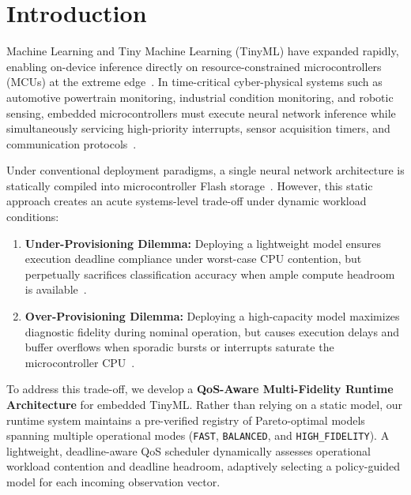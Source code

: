 \documentclass[journal]{IEEEtran}
\begin{document}
\maketitle
\IEEEdisplaynontitleabstractindextext

\section{Introduction}
 Machine Learning and Tiny Machine Learning (TinyML) have expanded rapidly, enabling on-device inference directly on resource-constrained microcontrollers (MCUs) at the extreme edge~\cite{warden2019tinyml,ray2022review,saha2022tinyml}. In time-critical cyber-physical systems such as automotive powertrain monitoring, industrial condition monitoring, and robotic sensing, embedded microcontrollers must execute neural network inference while simultaneously servicing high-priority interrupts, sensor acquisition timers, and communication protocols~\cite{sanchez2020tinyml,banbury2021benchmarking}.

Under conventional deployment paradigms, a single neural network architecture is statically compiled into microcontroller Flash storage~\cite{david2021tensorflow,lin2020mcunet,lin2021mcunetv2}. However, this static approach creates an acute systems-level trade-off under dynamic workload conditions:
\begin{enumerate}
    \item \textbf{Under-Provisioning Dilemma:} Deploying a lightweight model ensures execution deadline compliance under worst-case CPU contention, but perpetually sacrifices classification accuracy when ample compute headroom is available~\cite{sze2017efficient,liberis2021munas}.
    \item \textbf{Over-Provisioning Dilemma:} Deploying a high-capacity model maximizes diagnostic fidelity during nominal operation, but causes execution delays and buffer overflows when sporadic bursts or interrupts saturate the microcontroller CPU~\cite{buttazzo2011hard,lu2002feedback}.
\end{enumerate}

To address this trade-off, we develop a \textbf{QoS-Aware Multi-Fidelity Runtime Architecture} for embedded TinyML. Rather than relying on a static model, our runtime system maintains a pre-verified registry of Pareto-optimal models spanning multiple operational modes (\texttt{FAST}, \texttt{BALANCED}, and \texttt{HIGH\_FIDELITY}). A lightweight, deadline-aware QoS scheduler dynamically assesses operational workload contention and deadline headroom, adaptively selecting a policy-guided model for each incoming observation vector.
\end{document}
